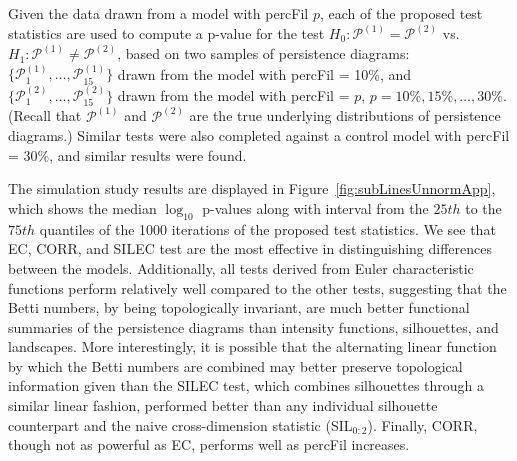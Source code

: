 \documentclass[12pt]{article}
\newcommand{\figref}[1]{Figure~\ref{#1}}
\begin{document}
Given the data drawn from a model with percFil $p$, each of the proposed test statistics are used to compute a p-value for the test $H_0: \mathcal
P^{(1)} = \mathcal P^{(2)}$ vs. $H_1: \mathcal P^{(1)} \neq \mathcal P^{(2)}$,
based on two samples of persistence diagrams: $\{\mathcal
P_1^{(1)}, \ldots, \mathcal P_{15}^{(1)}\}$ drawn from the model with percFil = 10\%, and $\{\mathcal P_1^{(2)}, \ldots,
\mathcal P_{15}^{(2)}\}$ drawn from the model with percFil = $p$, $p = 10\%, 15\%, \ldots, 30\%$.
(Recall that $\mathcal P^{(1)}$ and $\mathcal P^{(2)}$ are the true underlying distributions of persistence diagrams.)
Similar tests were also completed against a control model with percFil = 30\%, and similar results were found. 


The simulation study results are displayed in \figref{fig:subLinesUnnormApp}, which shows the median $\log_{10}$ p-values along with interval from the $25th$ to the $75th$ quantiles of the 1000 iterations of the proposed test statistics.
We see that  EC,  CORR, and SILEC test are the most effective in distinguishing differences between the models. 
Additionally, all tests derived from Euler characteristic functions perform relatively well compared to the other tests, suggesting that the Betti numbers, by being topologically invariant, are much better functional summaries of the persistence diagrams than intensity functions, silhouettes, and landscapes. More interestingly, it is possible that the alternating linear function by which the Betti numbers are combined may better preserve topological information given than the SILEC test, which combines silhouettes through a similar linear fashion, performed better than any individual silhouette counterpart and the naive cross-dimension statistic (SIL$_{0:2}$). Finally,  CORR, though not as powerful as EC, performs well as percFil increases.

\end{document}
